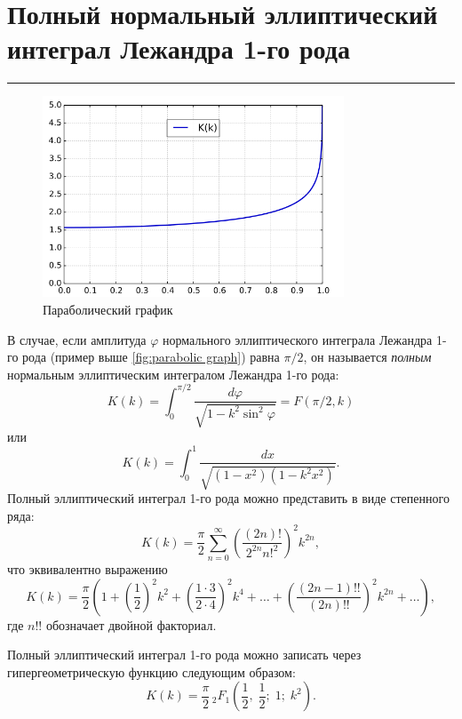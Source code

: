 \documentclass[fleqn]{article}
\begin{document}
	\section{Полный нормальный эллиптический интеграл Лежандра 1-го рода}
	\hrule
	\begin{figure}[h]
	\centering
	\includegraphics[width=0.8\textwidth]{Graphs/FirstKk.png}
	\caption{Параболический график}
	\label{fig:parabolic graph}
	\end{figure}
	В случае, если амплитуда $\varphi$ нормального эллиптического интеграла Лежандра 1-го рода (пример выше \eqref{fig:parabolic graph}) равна $\pi/2$, он называется \textit{полным} нормальным эллиптическим интегралом Лежандра 1-го рода: 
	\begin{equation*}K(k)=\int_0^{\pi/2}\frac{d\varphi}{\sqrt{1-k^2\sin^2\varphi}}=F(\pi/2,k)\end{equation*}
	или
	\begin{equation*}K(k)=\int^1_0\frac{dx}{\sqrt{(1-x^2)(1-k^2x^2)}}.\end{equation*}
	Полный эллиптический интеграл 1-го рода можно представить в виде степенного ряда:
	\begin{equation*}K(k)={\frac {\pi }{2}}\sum _{n=0}^{\infty }\left({\frac {(2n)!}{2^{2n}n!^{2}}}\right)^{2}k^{2n},\end{equation*}
	что эквивалентно выражению
	\begin{equation*}K(k)={\frac {\pi }{2}}\left(1+\left({\frac {1}{2}}\right)^{2}k^{2}+\left({\frac {1\cdot 3}{2\cdot 4}}\right)^{2}k^{4}+\ldots +\left({\frac {(2n-1)!!}{(2n)!!}}\right)^{2}k^{2n}+\ldots \right),\end{equation*}
	где $n!!$ обозначает двойной факториал.
	
	Полный эллиптический интеграл 1-го рода можно записать через гипергеометрическую функцию следующим образом:
	\begin{equation*}K(k)={\frac {\pi }{2}}\,_{2}F_{1}\left({\frac {1}{2}},\;{\frac {1}{2}};\;1;\;k^{2}\right).\end{equation*}
\end{document}
